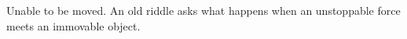 Unable to be moved. An old riddle asks what happens 
when an unstoppable force meets an immovable object.